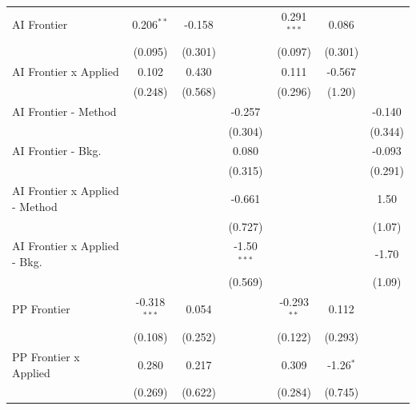 \begin{tabular}{lcccccc}
   AI Frontier                    & 0.206$^{**}$   & -0.158      &               & 0.291$^{***}$  & 0.086        &   \\   
                                  & (0.095)        & (0.301)     &               & (0.097)        & (0.301)      &   \\   
   AI Frontier x Applied          & 0.102          & 0.430       &               & 0.111          & -0.567       &   \\   
                                  & (0.248)        & (0.568)     &               & (0.296)        & (1.20)       &   \\   
   AI Frontier - Method           &                &             & -0.257        &                &              & -0.140\\   
                                  &                &             & (0.304)       &                &              & (0.344)\\   
   AI Frontier - Bkg.             &                &             & 0.080         &                &              & -0.093\\   
                                  &                &             & (0.315)       &                &              & (0.291)\\   
   AI Frontier x Applied - Method &                &             & -0.661        &                &              & 1.50\\   
                                  &                &             & (0.727)       &                &              & (1.07)\\   
   AI Frontier x Applied - Bkg.   &                &             & -1.50$^{***}$ &                &              & -1.70\\   
                                  &                &             & (0.569)       &                &              & (1.09)\\   
   PP Frontier                    & -0.318$^{***}$ & 0.054       &               & -0.293$^{**}$  & 0.112        &   \\   
                                  & (0.108)        & (0.252)     &               & (0.122)        & (0.293)      &   \\   
   PP Frontier x Applied          & 0.280          & 0.217       &               & 0.309          & -1.26$^{*}$  &   \\   
                                  & (0.269)        & (0.622)     &               & (0.284)        & (0.745)      &   \\   

\end{tabular}
